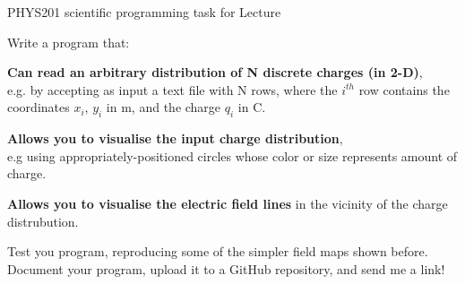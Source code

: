 {
\programmingslide

%
%
%

\begin{frame}{PHYS201 scientific programming task for Lecture \thislecture}

{\small

Write a program that:
\begin{itemize}
{\scriptsize
  \item {\bf Can read an arbitrary distribution of N discrete charges (in 2-D)},\\
        e.g. by accepting as input a text file with N rows, where the $i^{th}$
        row contains the coordinates $x_i$, $y_i$ in m, and the charge $q_i$ in C.
  \item {\bf Allows you to visualise the input charge distribution},\\
        e.g using appropriately-positioned circles whose color or size represents amount of charge.
  \item {\bf Allows you to visualise the electric field lines}
        in the vicinity of the charge distrubution.\\
}
\end{itemize}

\vspace{0.2cm}
Test you program, reproducing some of the simpler field maps shown before.\\

\vspace{0.2cm}
Document your program, upload it to a GitHub repository, and send me a link!\\

}

\end{frame}


} %
